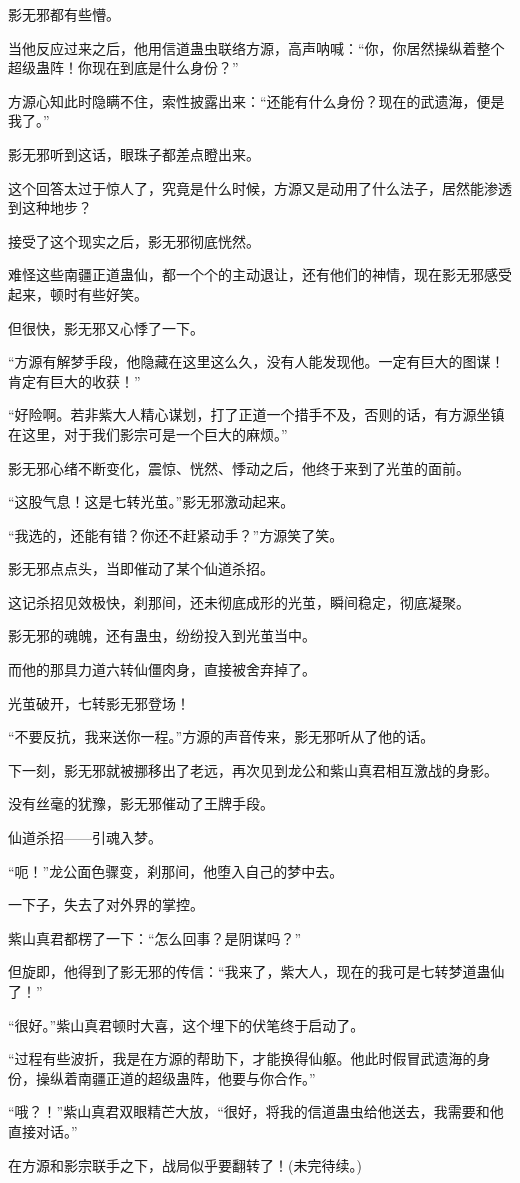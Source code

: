 \begin{this_body}
影无邪都有些懵。

当他反应过来之后，他用信道蛊虫联络方源，高声呐喊：“你，你居然操纵着整个超级蛊阵！你现在到底是什么身份？”

方源心知此时隐瞒不住，索性披露出来：“还能有什么身份？现在的武遗海，便是我了。”

影无邪听到这话，眼珠子都差点瞪出来。

这个回答太过于惊人了，究竟是什么时候，方源又是动用了什么法子，居然能渗透到这种地步？

接受了这个现实之后，影无邪彻底恍然。

难怪这些南疆正道蛊仙，都一个个的主动退让，还有他们的神情，现在影无邪感受起来，顿时有些好笑。

但很快，影无邪又心悸了一下。

“方源有解梦手段，他隐藏在这里这么久，没有人能发现他。一定有巨大的图谋！肯定有巨大的收获！”

“好险啊。若非紫大人精心谋划，打了正道一个措手不及，否则的话，有方源坐镇在这里，对于我们影宗可是一个巨大的麻烦。”

影无邪心绪不断变化，震惊、恍然、悸动之后，他终于来到了光茧的面前。

“这股气息！这是七转光茧。”影无邪激动起来。

“我选的，还能有错？你还不赶紧动手？”方源笑了笑。

影无邪点点头，当即催动了某个仙道杀招。

这记杀招见效极快，刹那间，还未彻底成形的光茧，瞬间稳定，彻底凝聚。

影无邪的魂魄，还有蛊虫，纷纷投入到光茧当中。

而他的那具力道六转仙僵肉身，直接被舍弃掉了。

光茧破开，七转影无邪登场！

“不要反抗，我来送你一程。”方源的声音传来，影无邪听从了他的话。

下一刻，影无邪就被挪移出了老远，再次见到龙公和紫山真君相互激战的身影。

没有丝毫的犹豫，影无邪催动了王牌手段。

仙道杀招——引魂入梦。

“呃！”龙公面色骤变，刹那间，他堕入自己的梦中去。

一下子，失去了对外界的掌控。

紫山真君都楞了一下：“怎么回事？是阴谋吗？”

但旋即，他得到了影无邪的传信：“我来了，紫大人，现在的我可是七转梦道蛊仙了！”

“很好。”紫山真君顿时大喜，这个埋下的伏笔终于启动了。

“过程有些波折，我是在方源的帮助下，才能换得仙躯。他此时假冒武遗海的身份，操纵着南疆正道的超级蛊阵，他要与你合作。”

“哦？！”紫山真君双眼精芒大放，“很好，将我的信道蛊虫给他送去，我需要和他直接对话。”

在方源和影宗联手之下，战局似乎要翻转了！(未完待续。)

\end{this_body}

